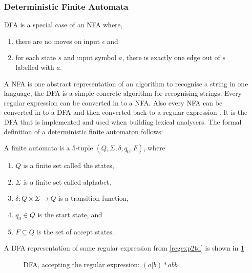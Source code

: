 \subsubsection{Deterministic Finite Automata}
DFA is a special case of an NFA where,
\begin{enumerate}
  \item there are no moves on input $\epsilon$ and
  \item for each state $s$ and input symbol $a$, there is exactly one edge out
        of $s$ labelled with $a$.
\end{enumerate}
A NFA is one abstract representation of an algorithm to recognise a string 
in one language, the DFA is a simple concrete algorithm for recognising strings. 
Every regular expression can be converted in to a NFA. Also every NFA can be 
converted in to a DFA and then converted back to a regular expression \cite{Aho2006}. 
It is the DFA that is implemented and used when building lexical analysers.
The formal definition of a deterministic finite automaton follows:
\begin{definition} \label{finiteAutomataDef}
A finite automata is a 5-tuple $(Q, \Sigma, \delta, q_0, F)$, where
\begin{enumerate}
  \item $Q$ is a finite set called the states,
  \item $\Sigma$ is a finite set called alphabet,
  \item $\delta: Q \times \Sigma \to Q$ is a transition function,
  \item $q_0 \in Q$ is the start state, and
  \item $F \subseteq Q$ is the set of accept states.
\end{enumerate} 
\end{definition}

\begin{example} \label{regexp2dfa}
A DFA representation of same regular expression from \cref{regexp2td} is shown in \cref{fig:dfa}
\end{example}
\begin{figure}[!h]
  \centering
  \caption{DFA, accepting the regular expression: $(a | b)* abb$
  \label{fig:dfa}}
\end{figure}

 
